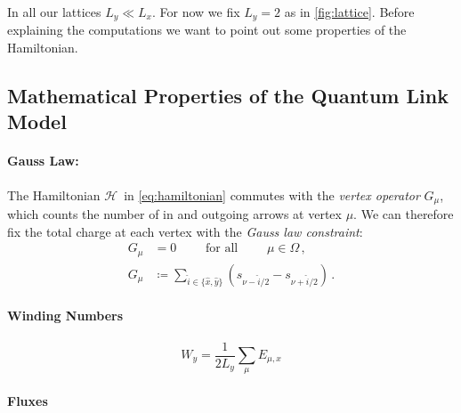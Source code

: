 \documentclass[12pt, a4paper, twoside, titlepage]{article}
\renewcommand{\H}{\ensuremath{\mathcal{H}}}
\begin{document}
In all our lattices $L_y \ll L_x$. For now we fix $L_y = 2$ as in \cref{fig:lattice}.
Before explaining the computations we want to point out some properties of the Hamiltonian.

\subsection{Mathematical Properties of the Quantum Link Model}
\paragraph{Gauss Law:}
The Hamiltonian \H\, in \cref{eq:hamiltonian}
commutes with the \textit{vertex operator} $G_\mu$, which counts the number of in and
outgoing arrows at vertex $\mu$. We can therefore fix the total charge at each vertex
with the \textit{Gauss law constraint}:
\begin{align}\label{eq:ice_rule}
  G_\mu&=0 \qquad\text{ for all }\qquad \mu \in \Omega\,,\\
  G_\mu &\coloneqq \sum_{\hat{i}\in\{\hat{x},\hat{y}\}} ( s_{\nu-\hat{i}/2}-s_{\nu+\hat{i}/2})\,.
\end{align}
\paragraph{Winding Numbers}
\begin{equation}
  W_y = \frac{1}{2L_y}\sum_\mu E_{\mu,x}
\end{equation}
\paragraph{Fluxes}
\end{document}
